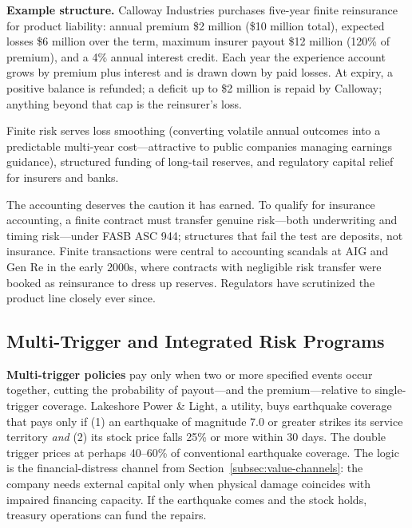 \documentclass[11pt,openany]{book}
\begin{document}
\textbf{Example structure.} Calloway Industries purchases five-year finite
reinsurance for product liability: annual premium \$2 million (\$10 million
total), expected losses \$6 million over the term, maximum insurer payout
\$12 million (120\% of premium), and a 4\% annual interest credit. Each year
the experience account grows by premium plus interest and is drawn down by
paid losses. At expiry, a positive balance is refunded; a deficit up to \$2
million is repaid by Calloway; anything beyond that cap is the reinsurer's
loss.

Finite risk serves loss smoothing (converting volatile annual outcomes into a
predictable multi-year cost---attractive to public companies managing
earnings guidance), structured funding of long-tail reserves, and regulatory
capital relief for insurers and banks.

The accounting deserves the caution it has earned. To qualify for insurance
accounting, a finite contract must transfer genuine risk---both underwriting
and timing risk---under FASB ASC 944; structures that fail the test are
deposits, not insurance. Finite transactions were central to accounting
scandals at AIG and Gen Re in the early 2000s, where contracts with
negligible risk transfer were booked as reinsurance to dress up reserves.
Regulators have scrutinized the product line closely ever since.

\subsection{Multi-Trigger and Integrated Risk Programs}

\textbf{Multi-trigger policies} pay only when two or more specified events
occur together, cutting the probability of payout---and the
premium---relative to single-trigger coverage. Lakeshore Power \& Light, a
utility, buys earthquake coverage that pays only if (1) an earthquake of
magnitude 7.0 or greater strikes its service territory \emph{and} (2) its
stock price falls 25\% or more within 30 days. The double trigger prices at
perhaps 40--60\% of conventional earthquake coverage. The logic is the
financial-distress channel from Section~\ref{subsec:value-channels}: the
company needs external capital only when physical damage coincides with
impaired financing capacity. If the earthquake comes and the stock holds,
treasury operations can fund the repairs.
\end{document}
